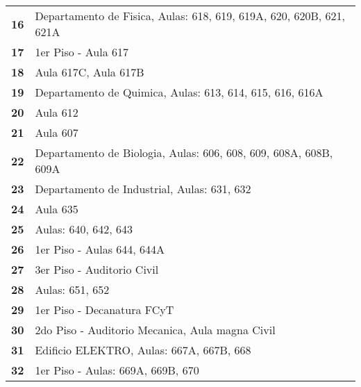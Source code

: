 \begin{longtable}{ c  X }
      \textbf{16}
      &
      Departamento de Fisica, Aulas: 618, 619, 619A, 620, 620B, 621, 621A
      \\

      \textbf{17}
      &
      1{\tiny er} Piso - Aula 617
      \\

      \textbf{18}
      &
      Aula 617C, Aula 617B
      \\

      \textbf{19}
      &
      Departamento de Quimica, Aulas: 613, 614, 615, 616, 616A
      \\

      \textbf{20}
      &
      Aula 612
      \\

      \textbf{21}
      &
      Aula 607
      \\

      \textbf{22}
      &
      Departamento de Biologia, Aulas: 606, 608, 609, 608A, 608B, 609A
      \\

      \textbf{23}
      &
      Departamento de Industrial, Aulas: 631, 632
      \\

      \textbf{24}
      &
      Aula 635
      \\

      \textbf{25}
      &
      Aulas: 640, 642, 643
      \\

      \textbf{26}
      &
      1{\tiny er} Piso - Aulas 644, 644A
      \\

      \textbf{27}
      &
      3{\tiny er} Piso - Auditorio Civil
      \\

      \textbf{28}
      &
      Aulas: 651, 652
      \\

      \textbf{29}
      &
      1{\tiny er} Piso - Decanatura FCyT
      \\

      \textbf{30}
      &
      2{\tiny do} Piso - Auditorio Mecanica, Aula magna Civil
      \\

      \textbf{31}
      &
      Edificio ELEKTRO, Aulas: 667A, 667B, 668
      \\

      \textbf{32}
      &
      1{\tiny er} Piso - Aulas: 669A, 669B, 670
      \\


\end{longtable}
